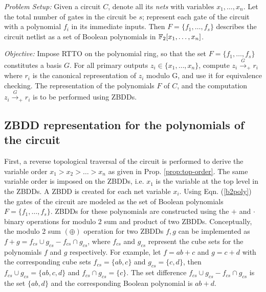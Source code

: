 
{\it Problem Setup:} Given a circuit $C$, denote all its {\it nets}
with variables $x_1,\dots,x_n$. Let the total number of gates in the
circuit be $s$; represent each gate of the circuit with a polynomial
$f_i$ in its immediate inputs. Then $F = \{f_1,\dots,f_s\}$ describes
the circuit netlist as a set of Boolean polynomials in
${\mathbb{F}}_{2}[x_1,\dots,x_n]$.  

{\it Objective:} Impose RTTO on the polynomial ring, so that the set
$F = \{f_1,\dots,f_s\}$ constitutes a \Grobner basis $G$. For all
primary outputs $z_i \in \{x_1,\dots,x_n\}$, compute
$z_i\xrightarrow{G}_+r_i$ where $r_i$ is the canonical representation
of $z_i$ modulo G, and use it for equivalence checking. The
representation of the polynomials $F$ of $C$, and the computation
$z_i\xrightarrow{G}_+r_i$ is to be performed using ZBDDs. 

\subsection{ZBDD representation for the polynomials of the circuit}


First, a reverse topological traversal of the circuit is performed to
derive the variable order $x_1 > x_2 > \dots > x_n$ as given in
Prop. \ref{prop:top-order}. The same variable order is imposed on the
ZBDDs, i.e. $x_1$ is the variable at the top level in the ZBDDs. A
ZBDD is created for each net variable $x_i$. Using Eqn. (\ref{b2poly})
the gates of the circuit are modeled as the set of Boolean polynomials
$F=\{f_1,\dots,f_s\}$. ZBDDs for these polynomials 
are constructed using the $+$ and $\cdot$ binary operations for modulo
2 sum and product of two ZBDDs.
%
Conceptually, the modulo 2 sum $(\oplus)$ operation for two ZBDDs
$f,g$ can be implemented as $f + g = f_{cs}\cup g_{cs}-f_{cs}\cap g_{cs}$, 
where $f_{cs}$ and $g_{cs}$ represent the cube sets for the
polynomials $f$ and $g$ respectively. For example, let $f = ab + c$
and $g = c + d$ with the corresponding cube sets 
$f_{cs} = \{ab,c\}$ and $g_{cs}=\{c,d\}$, then $f_{cs}\cup g_{cs} = \{ab,c,d\}$
and $f_{cs} \cap g_{cs} = \{c\}$. The set difference $f_{cs} \cup g_{cs} - f_{cs}
\cap g_{cs}$ is the set $\{ab,d\}$ and the corresponding Boolean
polynomial is $ab + d$.  


